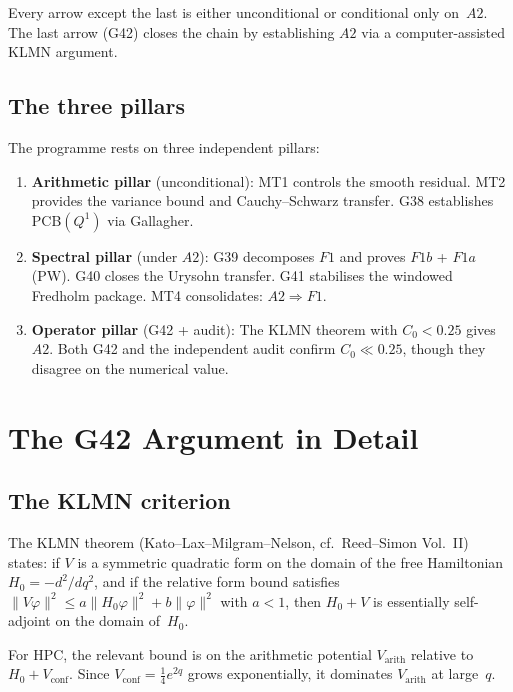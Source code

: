 \documentclass[11pt,a4paper]{article}
\begin{document}
Every arrow except the last is either unconditional or conditional only on~$A2$.  The last arrow (G42) closes the chain by establishing $A2$ via a computer-assisted KLMN argument.

\subsection{The three pillars}

The programme rests on three independent pillars:

\begin{enumerate}
    \item \textbf{Arithmetic pillar} (unconditional): MT1 controls the smooth residual.  MT2 provides the variance bound and Cauchy--Schwarz transfer.  G38 establishes PCB$(Q^1)$ via Gallagher.

    \item \textbf{Spectral pillar} (under $A2$): G39 decomposes $F1$ and proves $F1b$ + $F1a$(PW).  G40 closes the Urysohn transfer.  G41 stabilises the windowed Fredholm package.  MT4 consolidates: $A2\Rightarrow F1$.

    \item \textbf{Operator pillar} (G42 + audit): The KLMN theorem with $C_0 < 0.25$ gives $A2$.  Both G42 and the independent audit confirm $C_0\ll 0.25$, though they disagree on the numerical value.
\end{enumerate}

\section{The G42 Argument in Detail}

\subsection{The KLMN criterion}

The KLMN theorem (Kato--Lax--Milgram--Nelson, cf.~Reed--Simon Vol.~II) states: if $V$ is a symmetric quadratic form on the domain of the free Hamiltonian $H_0=-d^2/dq^2$, and if the relative form bound satisfies $\|V\varphi\|^2 \le a\|H_0\varphi\|^2 + b\|\varphi\|^2$ with $a<1$, then $H_0+V$ is essentially self-adjoint on the domain of~$H_0$.

For $\mathrm{HPC}$, the relevant bound is on the arithmetic potential $V_{\text{arith}}$ relative to $H_0 + V_{\text{conf}}$.  Since $V_{\text{conf}} = \tfrac{1}{4}e^{2q}$ grows exponentially, it dominates $V_{\text{arith}}$ at large~$q$.
\end{document}
